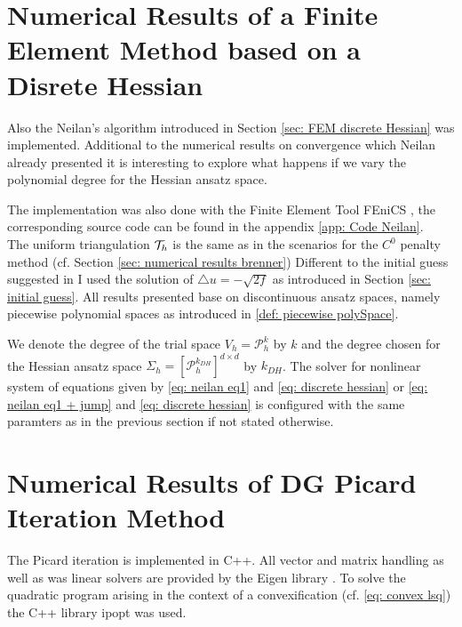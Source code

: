 \section{Numerical Results of a Finite Element Method based on a Disrete Hessian}\label{sec: numerical results neilan}

Also the Neilan's algorithm \cite{Neilan2014} introduced in Section \ref{sec: FEM discrete Hessian} was implemented.
Additional to the numerical results on convergence which Neilan already presented it is interesting to explore what happens if we vary the polynomial degree for the Hessian ansatz space. 

The implementation was also done with the Finite Element Tool FEniCS \cite{FEniCS}, the corresponding source code can be found in the appendix \ref{app: Code Neilan}. \\
The uniform triangulation $\mathcal{T}_h$ is the same as in the scenarios for the $C^0$ penalty method (cf. Section \ref{sec: numerical results brenner})
Different to the initial guess suggested in \cite{Neilan2014} I used the solution of $\triangle u = -\sqrt{2f}$ as introduced in Section \ref{sec: initial guess}. All results presented base on discontinuous ansatz spaces, namely piecewise polynomial spaces as introduced in \ref{def: piecewise polySpace}.

We denote the degree of the trial space $V_h=\mathcal P_h^k$ by $k$ and the degree chosen for the Hessian ansatz space $\Sigma_h = [\mathcal{P}_h^{k_{DH}}]^{d \times d}$ by $k_{DH}$. The solver for nonlinear system of equations given by \eqref{eq: neilan eq1} and \eqref{eq: discrete hessian} or \eqref{eq: neilan eq1 + jump} and \eqref{eq: discrete hessian} is configured with the same paramters as in the previous section if not stated otherwise. 










\newpage

\section{Numerical Results of DG Picard Iteration Method}

The Picard iteration is implemented in C++. All vector and matrix handling as well as was linear solvers are provided by the Eigen library \cite{eigenweb}. To solve the quadratic program arising in the context of a convexification (cf. \eqref{eq: convex lsq}) the C++ library ipopt \cite{ipopt} was used.

